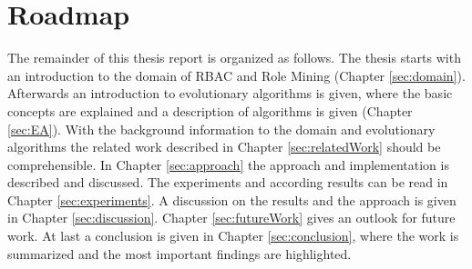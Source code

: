 \section{Roadmap}
The remainder of this thesis report is organized as follows. The thesis starts with an introduction to the domain of RBAC and Role Mining (Chapter \ref{sec:domain}). Afterwards an introduction to evolutionary algorithms is given, where the basic concepts are explained and a description of algorithms is given (Chapter \ref{sec:EA}). With the background information to the domain and evolutionary algorithms the related work described in Chapter \ref{sec:relatedWork} should be comprehensible. In Chapter \ref{sec:approach} the approach and implementation is described and discussed. The experiments and according results can be read in Chapter \ref{sec:experiments}. A discussion on the results and the approach is given in Chapter \ref{sec:discussion}. Chapter \ref{sec:futureWork} gives an outlook for future work. At last a conclusion is given in Chapter \ref{sec:conclusion}, where the work is summarized and the most important findings are highlighted.